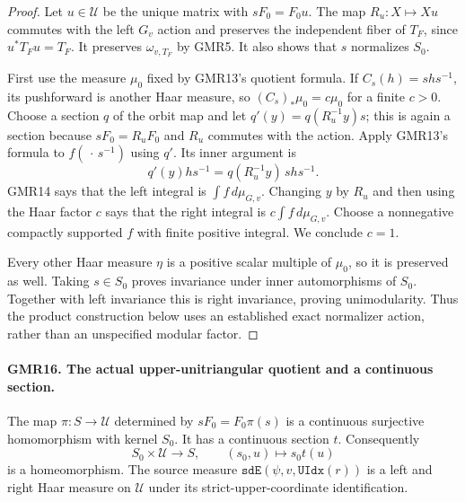 \begin{proof}
Let $u\in\mathcal U$ be the unique matrix with $sF_0=F_0u$.
The map $R_u:X\mapsto Xu$ commutes with the left $G_v$ action and
preserves the independent fiber of $T_F$, since $u^*T_Fu=T_F$.
It preserves $\omega_{v,T_F}$ by GMR5.  It also shows that $s$
normalizes $S_0$.

First use the measure $\mu_0$ fixed by GMR13's quotient formula.
If $C_s(h)=shs^{-1}$, its pushforward is another Haar measure,
so $(C_s)_*\mu_0=c\mu_0$ for a finite $c>0$.
Choose a section $q$ of the orbit map and let
$q'(y)=q(R_u^{-1}y)s$; this is again a section because
$sF_0=R_uF_0$ and $R_u$ commutes with the action.
Apply GMR13's formula to $f(\,\cdot\,s^{-1})$ using $q'$.
Its inner argument is
\[
 q'(y)h s^{-1}=q(R_u^{-1}y)\,s h s^{-1}.
\]
GMR14 says that the left integral is $\int f\,d\mu_{G,v}$.
Changing $y$ by $R_u$ and then using the Haar factor $c$ says that
the right integral is $c\int f\,d\mu_{G,v}$.
Choose a nonnegative compactly supported $f$ with finite positive
integral.  We conclude $c=1$.

Every other Haar measure $\eta$ is a positive scalar multiple of
$\mu_0$, so it is preserved as well.  Taking $s\in S_0$ proves
invariance under inner automorphisms of $S_0$.  Together with left
invariance this is right invariance, proving unimodularity.
Thus the product construction below uses an established exact
normalizer action, rather than an unspecified modular factor.
\end{proof}

\paragraph{GMR16. The actual upper-unitriangular quotient and a continuous section.}
\label{claim:GMR16}
The map $\pi:S\to\mathcal U$ determined by $sF_0=F_0\pi(s)$ is a
continuous surjective homomorphism with kernel $S_0$.  It has a
continuous section $t$.  Consequently
\[
 S_0\times\mathcal U\longrightarrow S,\qquad (s_0,u)\longmapsto s_0t(u)
 \tag{GMR.22}
\]
is a homeomorphism.  The source measure
$\texttt{sdE}(\psi,v,\texttt{UIdx}(r))$ is a left and right Haar measure
on $\mathcal U$ under its strict-upper-coordinate identification.

